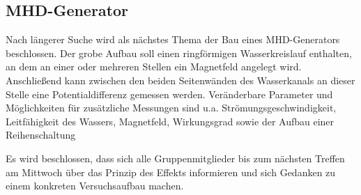 \documentclass[11pt]{scrartcl}
\begin{document}
\subsection{MHD-Generator}
Nach l\"angerer Suche wird als n\"achstes Thema der Bau eines MHD-Generators beschlossen. Der grobe Aufbau soll einen ringf\"ormigen Wasserkreislauf enthalten, an dem an einer oder mehreren Stellen ein Magnetfeld angelegt wird. Anschlie\ss end kann zwischen den beiden Seitenw\"anden des Wasserkanals an dieser Stelle eine Potentialdifferenz gemessen werden. Ver\"anderbare Parameter und M\"oglichkeiten f\"ur zus\"atzliche Messungen sind u.a. Str\"omungsgeschwindigkeit, Leitf\"ahigkeit des Wassers, Magnetfeld, Wirkungsgrad sowie der Aufbau einer Reihenschaltung

Es wird beschlossen, dass sich alle Gruppenmitglieder bis zum n\"achsten Treffen am Mittwoch \"uber das Prinzip des Effekts informieren und sich Gedanken zu einem konkreten Versuchsaufbau machen. 
\end{document}
